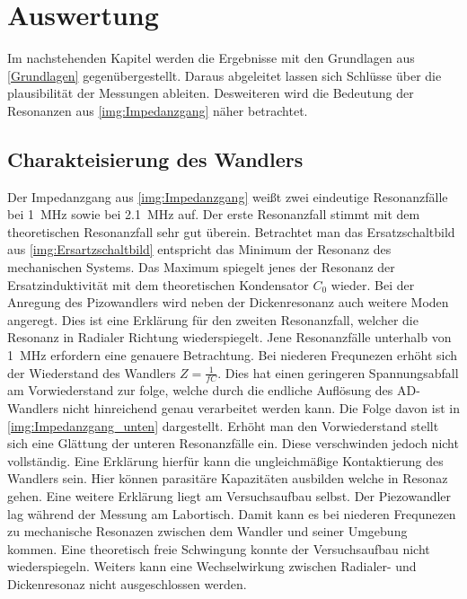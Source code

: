 \chapter{Auswertung} \label{Auswertung}

Im nachstehenden Kapitel werden die Ergebnisse mit den Grundlagen aus \autoref{Grundlagen} gegenübergestellt. 
Daraus abgeleitet lassen sich Schlüsse über die plausibilität der Messungen ableiten. 
Desweiteren wird die Bedeutung der Resonanzen aus \autoref{img:Impedanzgang} näher betrachtet.



\section{Charakteisierung des Wandlers}

Der Impedanzgang aus \autoref{img:Impedanzgang} weißt zwei eindeutige Resonanzfälle bei \SI{1}{MHz} sowie bei \SI{2.1}{MHz} auf. Der erste Resonanzfall stimmt mit dem theoretischen Resonanzfall sehr gut überein. Betrachtet man das Ersatzschaltbild aus \autoref{img:Ersartzschaltbild} entspricht das Minimum der Resonanz des mechanischen Systems.
Das Maximum spiegelt jenes der Resonanz der Ersatzinduktivität mit dem theoretischen Kondensator \(C_0\) wieder. 
Bei der Anregung des Pizowandlers wird neben der Dickenresonanz auch weitere Moden angeregt. Dies ist eine Erklärung für den zweiten Resonanzfall, welcher die Resonanz in Radialer Richtung wiederspiegelt. Jene Resonanzfälle unterhalb von \SI{1}{MHz} erfordern eine genauere Betrachtung.
Bei niederen Frequnezen erhöht sich der Wiederstand des Wandlers \(Z = \frac{1}{fC}\). Dies hat einen geringeren Spannungsabfall am Vorwiederstand zur folge, welche durch die endliche Auflösung des AD-Wandlers nicht hinreichend genau verarbeitet werden kann. Die Folge davon ist in \autoref{img:Impedanzgang_unten} dargestellt.
Erhöht man den Vorwiederstand stellt sich eine Glättung der unteren Resonanzfälle ein. Diese verschwinden jedoch nicht vollständig. Eine Erklärung hierfür kann die ungleichmäßige Kontaktierung des Wandlers sein. Hier können parasitäre Kapazitäten ausbilden welche in Resonaz gehen. 
Eine weitere Erklärung liegt am Versuchsaufbau selbst. Der Piezowandler lag während der Messung am Labortisch. Damit kann es bei niederen Frequnezen zu mechanische Resonazen zwischen dem Wandler und seiner Umgebung kommen. Eine theoretisch freie Schwingung konnte der Versuchsaufbau nicht wiederspiegeln.  
Weiters kann eine Wechselwirkung zwischen Radialer- und Dickenresonaz nicht ausgeschlossen werden.


